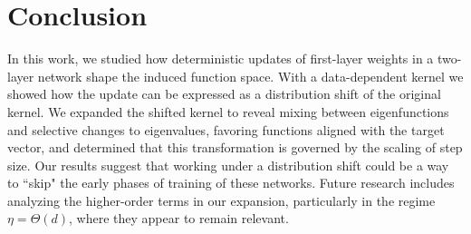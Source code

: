 \section{Conclusion}
In this work, we studied how deterministic updates of first-layer weights in a two-layer network shape the induced function space. With a data-dependent kernel we showed how the update can be expressed as a distribution shift of the original kernel. We expanded the shifted kernel to reveal mixing between eigenfunctions and selective changes to eigenvalues, favoring functions aligned with the target vector, and determined that this transformation is governed by the scaling of step size.  Our results suggest that working under a distribution shift could be a way to ``skip" the early phases of training of these networks. Future research includes analyzing the higher-order terms in our expansion, particularly in the regime $\eta = \Theta(d)$, where they appear to remain relevant.